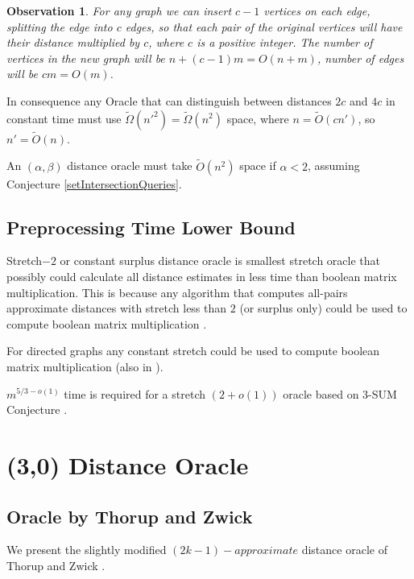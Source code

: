 \documentclass[shortabstract, lic, english]{iithesis}
\theoremstyle{definition} \newtheorem{definition}{Definition}[chapter]
\theoremstyle{plain} \newtheorem{remark}[definition]{Observation}
\theoremstyle{plain} \newtheorem{theorem}[definition]{Theorem}
\theoremstyle{plain} \newtheorem{lemma}[definition]{Lemma}
\theoremstyle{plain} \newtheorem{conjecture}[definition]{Conjecture}
\begin{document}
\begin{remark}
    For any graph we can insert $c-1$ vertices on each edge, splitting the edge into $c$ edges,
    so that each pair of the original vertices will have their distance multiplied by $c$, where $c$ is a positive integer.
    The number of vertices in the new graph will be $n + (c-1)m = O(n + m)$, number of edges will be $cm = O(m)$.
\end{remark}

In consequence any Oracle that can distinguish between distances $2c$ and $4c$ in constant time must use $\tilde{\Omega}(n'^2) = \tilde{\Omega}(n^2)$ space,
where $n = \tilde{O}(cn')$, so $n' = \tilde{O}(n)$.

An $(\alpha, \beta)$ distance oracle must take $\tilde{O}(n^2)$ space if $\alpha < 2$, assuming Conjecture \ref{setIntersectionQueries}.

\section{Preprocessing Time Lower Bound}
Stretch$-2$ or constant surplus distance oracle is smallest stretch oracle that possibly could calculate all distance estimates in less time than boolean matrix multiplication.
This is because any algorithm that computes all-pairs approximate distances with stretch less than $2$ (or surplus only)
could be used to compute boolean matrix multiplication \cite{matrixLowerBound}.

For directed graphs any constant stretch could be used to compute boolean matrix multiplication (also in \cite{matrixLowerBound}).

$m^{5/3 - o(1)}$ time is required for a stretch $(2 + o(1))$ oracle based on 3-SUM Conjecture \cite{3sumLowerBound}.




\chapter{(3,0) Distance Oracle} \label{30DistanceOracle}

\section{Oracle by Thorup and Zwick}

We present the slightly modified $(2k-1)-approximate$ distance oracle of Thorup and Zwick \cite{a0OraclesBasic}.
\end{document}
